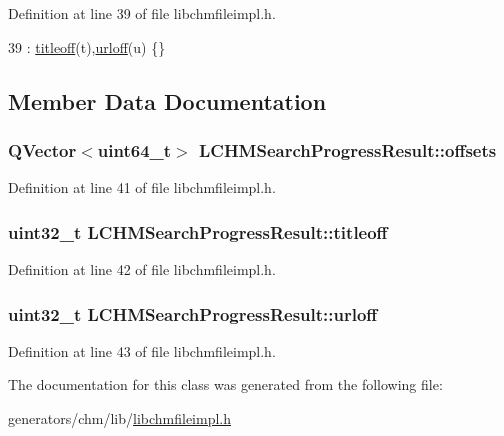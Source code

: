 Definition at line 39 of file libchmfileimpl.\+h.


\begin{DoxyCode}
39 : \hyperlink{classLCHMSearchProgressResult_a19efd6e530de64b24d8241e63879b10e}{titleoff}(t),\hyperlink{classLCHMSearchProgressResult_a5adc806eecbe534531e56d8c3bec9bee}{urloff}(u) \{\}
\end{DoxyCode}


\subsection{Member Data Documentation}
\hypertarget{classLCHMSearchProgressResult_a72f86fd02076b9234fbf3b7418740757}{
\subsubsection[{offsets}]{\setlength{\rightskip}{0pt plus 5cm}Q\+Vector$<$uint64\+\_\+t$>$ L\+C\+H\+M\+Search\+Progress\+Result\+::offsets}}\label{classLCHMSearchProgressResult_a72f86fd02076b9234fbf3b7418740757}


Definition at line 41 of file libchmfileimpl.\+h.

\hypertarget{classLCHMSearchProgressResult_a19efd6e530de64b24d8241e63879b10e}{
\subsubsection[{titleoff}]{\setlength{\rightskip}{0pt plus 5cm}uint32\+\_\+t L\+C\+H\+M\+Search\+Progress\+Result\+::titleoff}}\label{classLCHMSearchProgressResult_a19efd6e530de64b24d8241e63879b10e}


Definition at line 42 of file libchmfileimpl.\+h.

\hypertarget{classLCHMSearchProgressResult_a5adc806eecbe534531e56d8c3bec9bee}{
\subsubsection[{urloff}]{\setlength{\rightskip}{0pt plus 5cm}uint32\+\_\+t L\+C\+H\+M\+Search\+Progress\+Result\+::urloff}}\label{classLCHMSearchProgressResult_a5adc806eecbe534531e56d8c3bec9bee}


Definition at line 43 of file libchmfileimpl.\+h.



The documentation for this class was generated from the following file\+:\begin{DoxyCompactItemize}
\item 
generators/chm/lib/\hyperlink{libchmfileimpl_8h}{libchmfileimpl.\+h}\end{DoxyCompactItemize}
